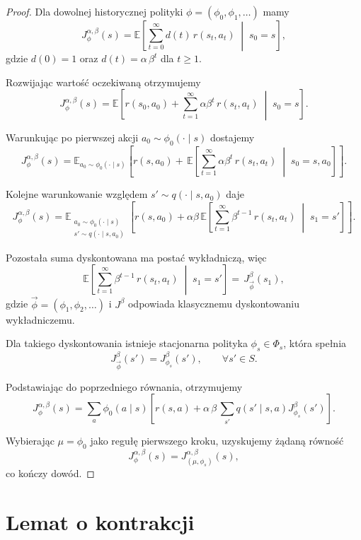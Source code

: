 \begin{proof}
Dla dowolnej historycznej polityki $\phi = (\phi_0, \phi_1, \ldots)$ mamy
\[
  J_{\phi}^{\alpha,\beta}(s) = \mathbb{E}\!\left[ \sum_{t=0}^{\infty} d(t)\, r(s_t, a_t) \;\middle|\; s_0 = s \right],
\]
gdzie $d(0) = 1$ oraz $d(t) = \alpha\,\beta^{t}$ dla $t \ge 1$.

Rozwijając wartość oczekiwaną otrzymujemy
\[
  J_{\phi}^{\alpha,\beta}(s) = \mathbb{E}\!\left[ r(s_0,a_0) + \sum_{t=1}^{\infty} \alpha \beta^{t}\, r(s_t,a_t) \;\middle|\; s_0 = s \right].
\]

Warunkując po pierwszej akcji $a_0 \sim \phi_0(\cdot \mid s)$ dostajemy
\[
  J_{\phi}^{\alpha,\beta}(s) = \mathbb{E}_{a_0 \sim \phi_0(\cdot \mid s)}\!\left[ r(s,a_0) + \,\mathbb{E}\!\left[ \sum_{t=1}^{\infty} \alpha \beta^{t}\, r(s_t,a_t) \;\middle|\; s_0 = s, a_0 \right] \right].
\]

Kolejne warunkowanie względem $s' \sim q(\cdot \mid s,a_0)$ daje
\[
  J_{\phi}^{\alpha,\beta}(s) = \mathbb{E}_{\substack{a_0 \sim \phi_0(\cdot \mid s) \\ s' \sim q(\cdot \mid s,a_0)}}\!\left[ r(s,a_0) + \alpha\beta\,\mathbb{E}\!\left[ \sum_{t=1}^{\infty} \beta^{t-1}\, r(s_t,a_t) \;\middle|\; s_1=s' \right] \right].
\]

Pozostała suma dyskontowana ma postać wykładniczą, więc
\[
  \mathbb{E}\!\left[ \sum_{t=1}^{\infty} \beta^{t-1}\, r(s_t,a_t) \;\middle|\; s_1 = s' \right] = \,J_{\overrightarrow{\phi}}^{\beta}(s_1),
\]
gdzie $\overrightarrow{\phi} = (\phi_1, \phi_2, \ldots)$ i $J^{\beta}$ odpowiada klasycznemu dyskontowaniu wykładniczemu.

Dla takiego dyskontowania istnieje stacjonarna polityka $\phi_s \in \Phi_s$, która spełnia
\[
  J^{\beta}_{\overrightarrow{\phi}}(s') = J^{\beta}_{\phi_s}(s'), \qquad \forall s' \in S.
\]

Podstawiając do poprzedniego równania, otrzymujemy
\[
  J_{\phi}^{\alpha,\beta}(s) = \sum_{a}\phi_{0}(a \mid s)\!\left[ r(s,a) + \alpha\,\beta\, \sum_{s'} q(s' \mid s,a) J^{\beta}_{\phi_s}(s') \right].
\]

Wybierając $\mu = \phi_0$ jako regułę pierwszego kroku, uzyskujemy żądaną równość
\[
  J_{\phi}^{\alpha,\beta}(s) = J_{(\mu,\phi_s)}^{\alpha,\beta}(s), 
\]
co kończy dowód.
\end{proof}

\section{Lemat o kontrakcji}

